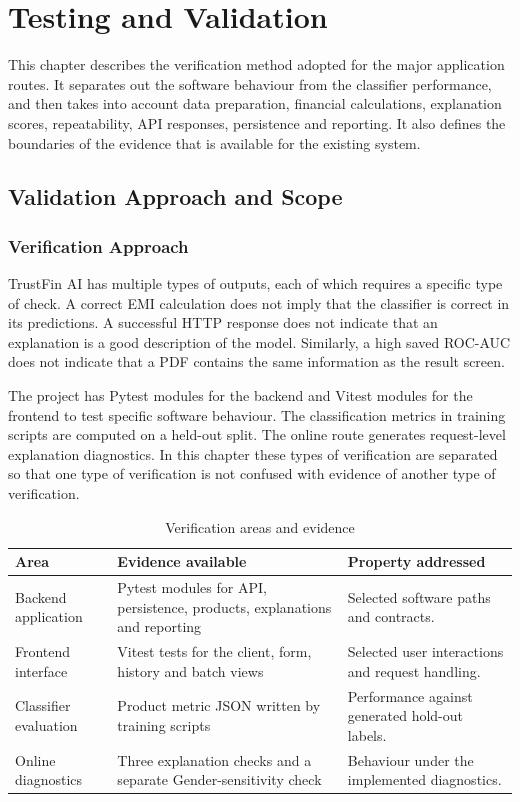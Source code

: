\chapter[TESTING AND VALIDATION]{Testing and Validation}

This chapter describes the verification method adopted for the major application routes. It separates out the software behaviour from the classifier performance, and then takes into account data preparation, financial calculations, explanation scores, repeatability, API responses, persistence and reporting. It also defines the boundaries of the evidence that is available for the existing system.

\section{Validation Approach and Scope}
\subsection{Verification Approach}
TrustFin AI has multiple types of outputs, each of which requires a specific type of check. A correct EMI calculation does not imply that the classifier is correct in its predictions. A successful HTTP response does not indicate that an explanation is a good description of the model. Similarly, a high saved ROC-AUC does not indicate that a PDF contains the same information as the result screen.

The project has Pytest modules for the backend and Vitest modules for the frontend to test specific software behaviour. The classification metrics in training scripts are computed on a held-out split. The online route generates request-level explanation diagnostics. In this chapter these types of verification are separated so that one type of verification is not confused with evidence of another type of verification.

\begin{table}[htbp]\centering\small
\caption{Verification areas and evidence}\label{tab:testing-summary}
\begin{tabularx}{\textwidth}{p{3.4cm}XX}\toprule
Area & Evidence available & Property addressed\\\midrule
Backend application & Pytest modules for API, persistence, products, explanations and reporting & Selected software paths and contracts.\\
Frontend interface & Vitest tests for the client, form, history and batch views & Selected user interactions and request handling.\\
Classifier evaluation & Product metric JSON written by training scripts & Performance against generated hold-out labels.\\
Online diagnostics & Three explanation checks and a separate Gender-sensitivity check & Behaviour under the implemented diagnostics.\\\bottomrule
\end{tabularx}\end{table}

